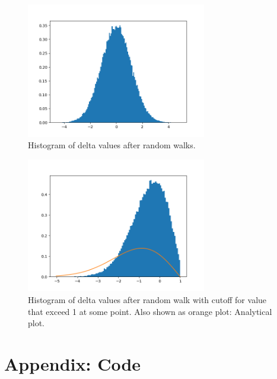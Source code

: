 \documentclass[12p,a4paper]{article}
\begin{document}
\begin{figure}[H]
    \centering
    \includegraphics[width=0.7\textwidth]{hist1.png}
    \caption{Histogram of delta values after random walks.}
\end{figure}
\begin{figure}[H]
    \centering
    \includegraphics[width=0.7\textwidth]{hist2.png}
    \caption{Histogram of delta values after random walk with cutoff for value that exceed 1 at some point. Also shown as orange plot: Analytical plot.}
\end{figure}






\section*{Appendix: Code}



\end{document}
